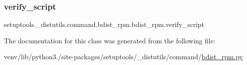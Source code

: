 \subsubsection{\texorpdfstring{verify\+\_\+script}{verify\_script}}
{\footnotesize\ttfamily setuptools.\+\_\+distutils.\+command.\+bdist\+\_\+rpm.\+bdist\+\_\+rpm.\+verify\+\_\+script}



The documentation for this class was generated from the following file\+:\begin{DoxyCompactItemize}
\item 
venv/lib/python3./site-\/packages/setuptools/\+\_\+distutils/command/\hyperlink{setuptools_2__distutils_2command_2bdist__rpm_8py}{bdist\+\_\+rpm.\+py}\end{DoxyCompactItemize}
